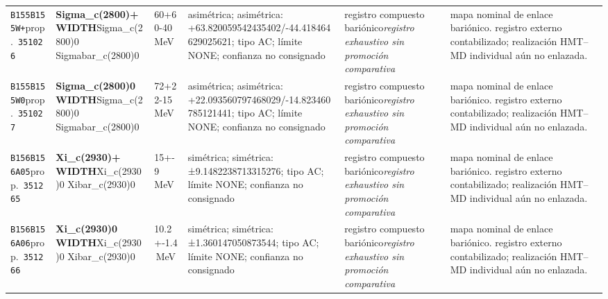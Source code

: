 \begin{landscape}
\begin{longtable}{L{1.85cm}L{4.45cm}L{2.35cm}L{4.05cm}L{3.35cm}L{7.15cm}}
\texttt{B155}\newline \texttt{B155W+}\newline prop.\ \texttt{351026} & \textbf{Sigma\_\allowbreak{}c(2800)+ WIDTH}\newline Sigma\_\allowbreak{}c(2800)0 \textbar{}\allowbreak{} Sigmabar\_\allowbreak{}c(2800)0 & 60+60-40\,MeV & asimétrica; asimétrica: +63.820059542435402/-44.418464629025621; tipo AC; límite NONE; confianza no consignado & registro compuesto bariónico\newline \emph{registro exhaustivo sin promoción comparativa} & mapa nominal de enlace bariónico. registro externo contabilizado; realización HMT--MD individual aún no enlazada. \\
\texttt{B155}\newline \texttt{B155W0}\newline prop.\ \texttt{351027} & \textbf{Sigma\_\allowbreak{}c(2800)0 WIDTH}\newline Sigma\_\allowbreak{}c(2800)0 \textbar{}\allowbreak{} Sigmabar\_\allowbreak{}c(2800)0 & 72+22-15\,MeV & asimétrica; asimétrica: +22.093560797468029/-14.823460785121441; tipo AC; límite NONE; confianza no consignado & registro compuesto bariónico\newline \emph{registro exhaustivo sin promoción comparativa} & mapa nominal de enlace bariónico. registro externo contabilizado; realización HMT--MD individual aún no enlazada. \\
\texttt{B156}\newline \texttt{B156A05}\newline prop.\ \texttt{351265} & \textbf{Xi\_\allowbreak{}c(2930)+ WIDTH}\newline Xi\_\allowbreak{}c(2930)0 \textbar{}\allowbreak{} Xibar\_\allowbreak{}c(2930)0 & 15+-9\,MeV & simétrica; simétrica: ±9.1482238713315276; tipo AC; límite NONE; confianza no consignado & registro compuesto bariónico\newline \emph{registro exhaustivo sin promoción comparativa} & mapa nominal de enlace bariónico. registro externo contabilizado; realización HMT--MD individual aún no enlazada. \\
\texttt{B156}\newline \texttt{B156A06}\newline prop.\ \texttt{351266} & \textbf{Xi\_\allowbreak{}c(2930)0 WIDTH}\newline Xi\_\allowbreak{}c(2930)0 \textbar{}\allowbreak{} Xibar\_\allowbreak{}c(2930)0 & 10.2+-1.4\,MeV & simétrica; simétrica: ±1.360147050873544; tipo AC; límite NONE; confianza no consignado & registro compuesto bariónico\newline \emph{registro exhaustivo sin promoción comparativa} & mapa nominal de enlace bariónico. registro externo contabilizado; realización HMT--MD individual aún no enlazada. \\

\end{longtable}
\end{landscape}
